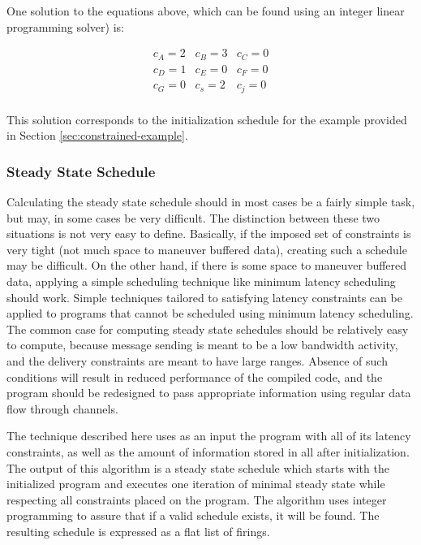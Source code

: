 One solution to the equations above, which can be found using an
integer linear programming solver) is:

\begin{displaymath}
\begin{array}{ccc}
c_A = 2 & c_B = 3 & c_C = 0 \\
c_D = 1 & c_E = 0 & c_F = 0 \\
c_G = 0 & c_s = 2 & c_j = 0 \\
\end{array}
\end{displaymath}

This solution corresponds to the initialization schedule for the
example provided in Section \ref{sec:constrained-example}.

\subsubsection{Steady State Schedule}

Calculating the steady state schedule should in most cases be a
fairly simple task, but may, in some cases be very difficult. The
distinction between these two situations is not very easy to
define.  Basically, if the imposed set of constraints is very
tight (not much space to maneuver buffered data), creating such a
schedule may be difficult.  On the other hand, if there is some
space to maneuver buffered data, applying a simple scheduling
technique like minimum latency scheduling should work.  Simple
techniques tailored to satisfying latency constraints can be
applied to programs that cannot be scheduled using minimum latency
scheduling.  The common case for computing steady state schedules
should be relatively easy to compute, because message sending is
meant to be a low bandwidth activity, and the delivery constraints
are meant to have large ranges. Absence of such conditions will
result in reduced performance of the compiled code, and the
program should be redesigned to pass appropriate information using
regular data flow through channels.

The technique described here uses as an input the {\StreamIt}
program with all of its latency constraints, as well as the amount
of information stored in all {{\Channels}} after initialization. The
output of this algorithm is a steady state schedule which starts
with the initialized program and executes one iteration of minimal
steady state while respecting all constraints placed on the
program. The algorithm uses integer programming to assure that if
a valid schedule exists, it will be found.  The resulting schedule
is expressed as a flat list of {\filter} firings.

